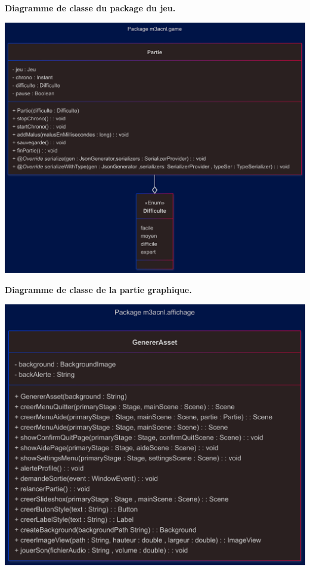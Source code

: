 \textbf{Diagramme de classe du package du jeu.}\\
\begin{center}
    \includegraphics[width=\textwidth,height=\textheight,keepaspectratio]{../Annexe/classes/game.png}
\end{center}

\pagebreak

\textbf{Diagramme de classe de la partie graphique.}\\
\begin{center}
    \includegraphics[width=\textwidth,height=\textheight,keepaspectratio]{../Annexe/classes/affichage.png}
\end{center}

